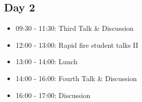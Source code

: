 \documentclass[]{scrartcl}
\begin{document}
\subsection*{Day 2}
\begin{itemize}
	\item 09:30 - 11:30: Third Talk \& Discussion
	\item 12:00 - 13:00: Rapid fire student talks II
	\item 13:00 - 14:00: Lunch
	\item 14:00 - 16:00: Fourth Talk \& Discussion
	\item 16:00 - 17:00: Discussion
\end{itemize}
\end{document}
